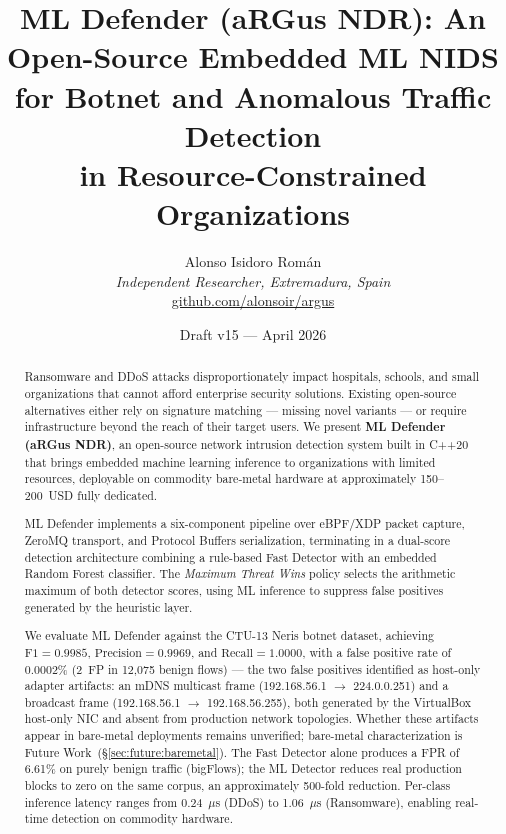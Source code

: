 \documentclass[11pt,a4paper]{article}
\title{\textbf{ML Defender (aRGus NDR): An Open-Source Embedded ML NIDS\\
for Botnet and Anomalous Traffic Detection\\
in Resource-Constrained Organizations}}
\author{
    Alonso Isidoro Rom\'an\\
    \textit{Independent Researcher, Extremadura, Spain}\\
    \href{https://github.com/alonsoir/argus}{github.com/alonsoir/argus}
}
\date{Draft v15 --- April 2026}
\begin{document}

    \maketitle

    \begin{abstract}
        Ransomware and DDoS attacks disproportionately impact hospitals, schools, and small
        organizations that cannot afford enterprise security solutions. Existing open-source
        alternatives either rely on signature matching --- missing novel variants --- or require
        infrastructure beyond the reach of their target users. We present \textbf{ML Defender
            (aRGus NDR)}, an open-source network intrusion detection system built in C++20 that brings
        embedded machine learning inference to organizations with limited resources, deployable on
        commodity bare-metal hardware at approximately 150--200~USD fully dedicated.

        ML Defender implements a six-component pipeline over eBPF/XDP packet capture, ZeroMQ
        transport, and Protocol Buffers serialization, terminating in a dual-score detection
        architecture combining a rule-based Fast Detector with an embedded Random Forest classifier.
        The \emph{Maximum Threat Wins} policy selects the arithmetic maximum of both detector scores,
        using ML inference to suppress false positives generated by the heuristic layer.

        We evaluate ML Defender against the CTU-13 Neris botnet dataset, achieving
        $\text{F1} = 0.9985$, $\text{Precision} = 0.9969$, and $\text{Recall} = 1.0000$,
        with a false positive rate of 0.0002\% (2~FP in 12,075 benign flows) --- the two false
        positives identified as host-only adapter artifacts: an mDNS multicast frame
        (192.168.56.1 $\to$ 224.0.0.251) and a broadcast frame (192.168.56.1 $\to$
        192.168.56.255), both generated by the VirtualBox host-only NIC and absent from
        production network topologies. Whether these artifacts appear in bare-metal deployments
        remains unverified; bare-metal characterization is Future Work~(\S\ref{sec:future:baremetal}).
        The Fast Detector alone produces a FPR of 6.61\% on purely benign
        traffic (bigFlows); the ML Detector reduces real production blocks to zero on the same
        corpus, an approximately 500-fold reduction. Per-class inference latency ranges from
        0.24~$\mu$s (DDoS) to 1.06~$\mu$s (Ransomware), enabling real-time detection on commodity
        hardware.


\end{abstract}
\end{document}
